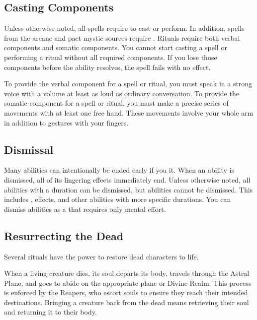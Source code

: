   \subsection{Casting Components}\label{Casting Components}
    Unless otherwise noted, all spells require  to cast or perform.
    In addition, spells from the arcane and pact mystic sources require .
    Rituals require both verbal components and somatic components.
    You cannot start casting a spell or performing a ritual without all required components.
    If you lose those components before the ability resolves, the spell fails with no effect.

    To provide the verbal component for a spell or ritual, you must speak in a strong voice with a volume at least as loud as ordinary conversation.
    To provide the somatic component for a spell or ritual, you must make a precise series of movements with at least one free hand.
    These movements involve your whole arm in addition to gestures with your fingers.

  \subsection{Dismissal}\label{Dismissal}
    Many abilities can intentionally be ended early if you  it.
    When an ability is dismissed, all of its lingering effects immediately end.
    Unless otherwise noted, all \magical abilities with a duration can be dismissed, but  abilities cannot be dismissed.
    This includes ,  effects, and other abilities with more specific durations.
    You can dismiss abilities as a  that requires only mental effort.

  \subsection{Resurrecting the Dead}\label{Resurrecting the Dead}
    Several rituals have the power to restore dead characters to life.

    When a living creature dies, its soul departs its body, travels through the Astral Plane, and goes to abide on the appropriate plane or Divine Realm.
    This process is enforced by the Reapers, who escort souls to ensure they reach their intended destinations.
    Bringing a creature back from the dead means retrieving their soul and returning it to their body.

